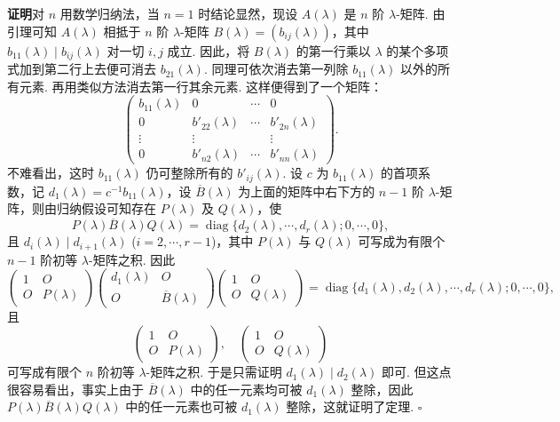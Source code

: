\documentclass[UTF8,12pt,a4paper,fontset=fandol]{ctexart}
\begin{document}
\noindent\textbf{证明}\quad 对 $n$ 用数学归纳法，当 $n=1$ 时结论显然，现设 $A(\lambda)$ 是 $n$ 阶 $\lambda$-矩阵. 由引理可知 $A(\lambda)$ 相抵于 $n$ 阶 $\lambda$-矩阵 $B(\lambda)=(b_{ij}(\lambda))$，其中 $b_{11}(\lambda)\mid b_{ij}(\lambda)$ 对一切 $i,j$ 成立. 因此，将 $B(\lambda)$ 的第一行乘以 $\lambda$ 的某个多项式加到第二行上去便可消去 $b_{21}(\lambda)$. 同理可依次消去第一列除 $b_{11}(\lambda)$ 以外的所有元素. 再用类似方法消去第一行其余元素. 这样便得到了一个矩阵：
\[
\left(\begin{array}{cccc}
b_{11}(\lambda) & 0 & \cdots & 0\\
0 & b'_{22}(\lambda) & \cdots & b'_{2n}(\lambda)\\
\vdots & \vdots & & \vdots\\
0 & b'_{n2}(\lambda) & \cdots & b'_{nn}(\lambda)
\end{array}\right).
\]
不难看出，这时 $b_{11}(\lambda)$ 仍可整除所有的 $b'_{ij}(\lambda)$. 设 $c$ 为 $b_{11}(\lambda)$ 的首项系数，记 $d_1(\lambda)=c^{-1}b_{11}(\lambda)$，设 $\overline{B}(\lambda)$ 为上面的矩阵中右下方的 $n-1$ 阶 $\lambda$-矩阵，则由归纳假设可知存在 $P(\lambda)$ 及 $Q(\lambda)$，使
\[
P(\lambda)\overline{B}(\lambda)Q(\lambda)=\operatorname{diag}\{d_2(\lambda),\cdots,d_r(\lambda);0,\cdots,0\},
\]
且 $d_i(\lambda)\mid d_{i+1}(\lambda)$ ($i=2,\cdots,r-1$)，其中 $P(\lambda)$ 与 $Q(\lambda)$ 可写成为有限个 $n-1$ 阶初等 $\lambda$-矩阵之积. 因此
\[
\left(\begin{array}{cc}
1 & O\\
O & P(\lambda)
\end{array}\right)
\left(\begin{array}{cc}
d_1(\lambda) & O\\
O & \overline{B}(\lambda)
\end{array}\right)
\left(\begin{array}{cc}
1 & O\\
O & Q(\lambda)
\end{array}\right)
=\operatorname{diag}\{d_1(\lambda),d_2(\lambda),\cdots,d_r(\lambda);0,\cdots,0\},
\]
且
\[
\left(\begin{array}{cc}
1 & O\\
O & P(\lambda)
\end{array}\right),\quad
\left(\begin{array}{cc}
1 & O\\
O & Q(\lambda)
\end{array}\right)
\]
可写成有限个 $n$ 阶初等 $\lambda$-矩阵之积. 于是只需证明 $d_1(\lambda)\mid d_2(\lambda)$ 即可. 但这点很容易看出，事实上由于 $\overline{B}(\lambda)$ 中的任一元素均可被 $d_1(\lambda)$ 整除，因此 $P(\lambda)\overline{B}(\lambda)Q(\lambda)$ 中的任一元素也可被 $d_1(\lambda)$ 整除，这就证明了定理. $\square$
\end{document}

